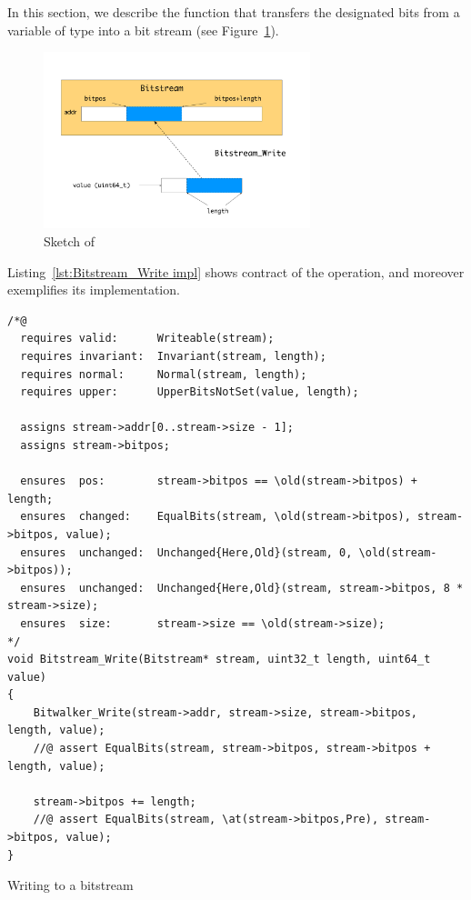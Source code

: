 In this section, we describe the function  that
transfers the designated bits from a variable of type  into
a bit stream (see Figure~\ref{fig:bitstream-write}).


\begin{figure}[hbt]
\begin{center}
\includegraphics[width=0.69\textwidth]{figures/bitstream-write.pdf}
\caption{\label{fig:bitstream-write}
	Sketch of }
\end{center}
\end{figure}


\FloatBarrier

Listing~\ref{lst:Bitstream_Write impl} shows contract of
the  operation,
and moreover exemplifies its implementation.


\begin{listing}[hbt]
\begin{minipage}{0.99\textwidth}
\begin{lstlisting}[style=acsl-block]
/*@
  requires valid:      Writeable(stream);
  requires invariant:  Invariant(stream, length);
  requires normal:     Normal(stream, length);
  requires upper:      UpperBitsNotSet(value, length);

  assigns stream->addr[0..stream->size - 1];
  assigns stream->bitpos;

  ensures  pos:        stream->bitpos == \old(stream->bitpos) + length;
  ensures  changed:    EqualBits(stream, \old(stream->bitpos), stream->bitpos, value);
  ensures  unchanged:  Unchanged{Here,Old}(stream, 0, \old(stream->bitpos));
  ensures  unchanged:  Unchanged{Here,Old}(stream, stream->bitpos, 8 * stream->size);
  ensures  size:       stream->size == \old(stream->size);
*/
void Bitstream_Write(Bitstream* stream, uint32_t length, uint64_t value)
{
    Bitwalker_Write(stream->addr, stream->size, stream->bitpos, length, value);
    //@ assert EqualBits(stream, stream->bitpos, stream->bitpos + length, value);

    stream->bitpos += length;
    //@ assert EqualBits(stream, \at(stream->bitpos,Pre), stream->bitpos, value);
}

\end{lstlisting}
\end{minipage}
\caption{\label{lst:Bitstream_Write impl}Writing to a bitstream}
\end{listing}


